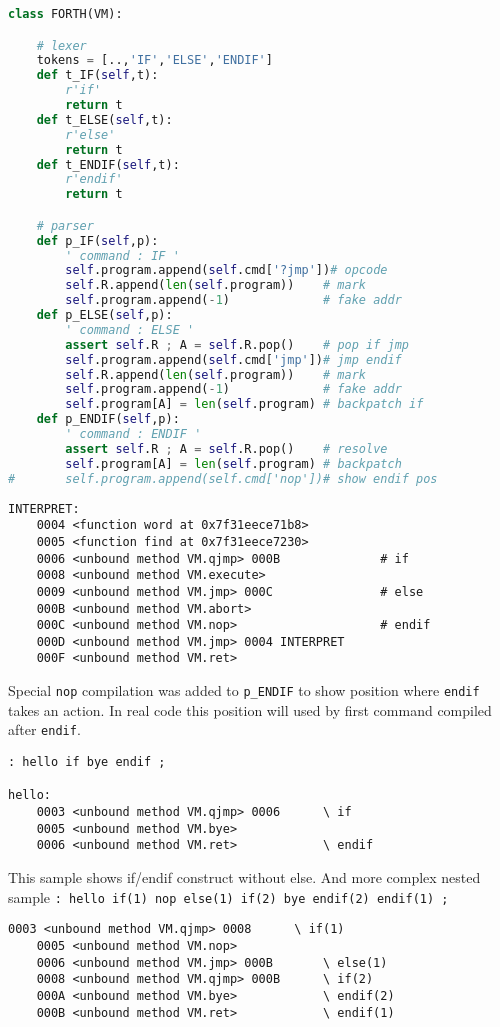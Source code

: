 \clearpage
\begin{lstlisting}[language=Python]
class FORTH(VM):

	# lexer
	tokens = [..,'IF','ELSE','ENDIF']
 	def t_IF(self,t):
 		r'if'
 		return t
 	def t_ELSE(self,t):
 		r'else'
 		return t
 	def t_ENDIF(self,t):
 		r'endif'
 		return t

 	# parser
	def p_IF(self,p):
		' command : IF '
		self.program.append(self.cmd['?jmp'])# opcode
		self.R.append(len(self.program))	# mark
		self.program.append(-1)				# fake addr
	def p_ELSE(self,p):
		' command : ELSE '
		assert self.R ; A = self.R.pop()	# pop if jmp
		self.program.append(self.cmd['jmp'])# jmp endif
		self.R.append(len(self.program))	# mark
		self.program.append(-1)				# fake addr
		self.program[A] = len(self.program)	# backpatch if
	def p_ENDIF(self,p):
		' command : ENDIF '
		assert self.R ; A = self.R.pop()	# resolve
		self.program[A] = len(self.program)	# backpatch
# 		self.program.append(self.cmd['nop'])# show endif pos
\end{lstlisting}

\begin{lstlisting}
INTERPRET: 
	0004 <function word at 0x7f31eece71b8> 
	0005 <function find at 0x7f31eece7230> 
	0006 <unbound method VM.qjmp> 000B  			# if
	0008 <unbound method VM.execute> 
	0009 <unbound method VM.jmp> 000C				# else
	000B <unbound method VM.abort> 
	000C <unbound method VM.nop>					# endif
	000D <unbound method VM.jmp> 0004 INTERPRET 
	000F <unbound method VM.ret>
\end{lstlisting}
Special \verb|nop| compilation was added to \verb|p_ENDIF| to show position
where \verb|endif| takes an action. In real code this position will used by 
first command compiled after \verb|endif|.

\clearpage
\begin{lstlisting}[language=Forth]
: hello if bye endif ;

hello: 
	0003 <unbound method VM.qjmp> 0006		\ if
	0005 <unbound method VM.bye> 
	0006 <unbound method VM.ret>			\ endif
\end{lstlisting}
This sample shows if/endif construct without else. And more complex nested
sample \verb|: hello if(1) nop else(1) if(2) bye endif(2) endif(1) ;|

\begin{lstlisting}[language=Forth]
	0003 <unbound method VM.qjmp> 0008		\ if(1)  
	0005 <unbound method VM.nop> 
	0006 <unbound method VM.jmp> 000B  		\ else(1)
	0008 <unbound method VM.qjmp> 000B		\ if(2)
	000A <unbound method VM.bye> 			\ endif(2)
	000B <unbound method VM.ret>			\ endif(1)
\end{lstlisting}

